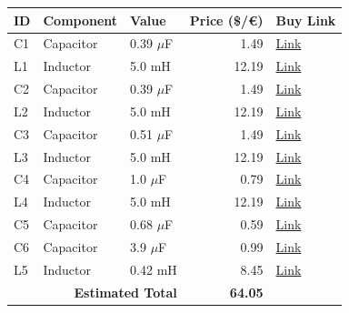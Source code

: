 \documentclass[11pt,a4paper]{report}
\begin{document}
\vspace{0.5cm}
\begin{table}[H]
    \centering
    \renewcommand{\arraystretch}{1.5}
    \begin{tabular}{@{}lllrl@{}}
        \toprule
        \textbf{ID} & \textbf{Component} & \textbf{Value} & \textbf{Price (\$/€)} & \textbf{Buy Link} \\
        \midrule
        C1 & Capacitor & 0.39 $\mu$F & 1.49 & \href{https://www.soundimports.eu/en/jantzen-audio-001-0216.html}{Link} \\
        L1 & Inductor & 5.0 mH & 12.19 & \href{https://www.parts-express.com/Dayton-Audio-IC185-5.0mH-18-AWG-Laminated-Iron-Core-Inductor-257-668}{Link} \\
        C2 & Capacitor & 0.39 $\mu$F & 1.49 & \href{https://www.soundimports.eu/en/jantzen-audio-001-0216.html}{Link} \\
        L2 & Inductor & 5.0 mH & 12.19 & \href{https://www.parts-express.com/Dayton-Audio-IC185-5.0mH-18-AWG-Laminated-Iron-Core-Inductor-257-668}{Link} \\
        C3 & Capacitor & 0.51 $\mu$F & 1.49 & \href{https://www.soundimports.eu/en/jantzen-audio-001-0222.html}{Link} \\
        L3 & Inductor & 5.0 mH & 12.19 & \href{https://www.parts-express.com/Dayton-Audio-IC185-5.0mH-18-AWG-Laminated-Iron-Core-Inductor-257-668}{Link} \\
        C4 & Capacitor & 1.0 $\mu$F & 0.79 & \href{https://www.parts-express.com/Dayton-Audio-PMPC-1.0-1.0uF-250V-Precision-Audio-Capacitor-027-210}{Link} \\
        L4 & Inductor & 5.0 mH & 12.19 & \href{https://www.parts-express.com/Dayton-Audio-IC185-5.0mH-18-AWG-Laminated-Iron-Core-Inductor-257-668}{Link} \\
        C5 & Capacitor & 0.68 $\mu$F & 0.59 & \href{https://www.parts-express.com/Dayton-Audio-DMPC-0.68-0.68uF-250V-Polypropylene-Capacitor-027-408}{Link} \\
        C6 & Capacitor & 3.9 $\mu$F & 0.99 & \href{https://www.soundimports.eu/en/jantzen-audio-001-6020.html}{Link} \\
        L5 & Inductor & 0.42 mH & 8.45 & \href{https://www.soundimports.eu/en/jantzen-audio-000-1577.html}{Link} \\
        \midrule
        \multicolumn{3}{r}{\textbf{Estimated Total}} & \textbf{64.05} & \\
        \bottomrule
    \end{tabular}
\end{table}
\end{document}
